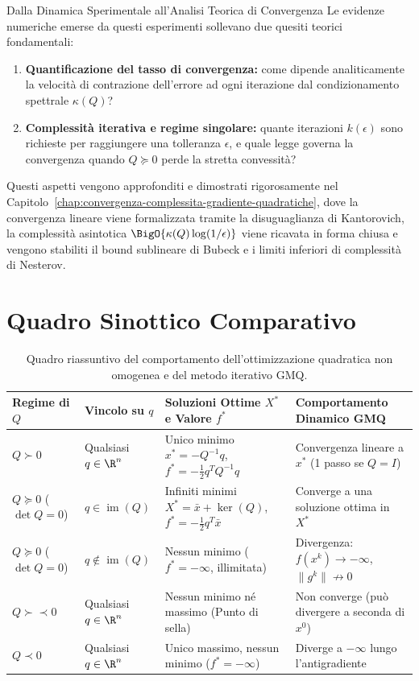 \begin{noteblock}{Dalla Dinamica Sperimentale all'Analisi Teorica di Convergenza}
Le evidenze numeriche emerse da questi esperimenti sollevano due quesiti teorici fondamentali:
\begin{enumerate}
    \item \textbf{Quantificazione del tasso di convergenza:} come dipende analiticamente la velocit\`a di contrazione dell'errore ad ogni iterazione dal condizionamento spettrale $\kappa(Q)$?
    \item \textbf{Complessit\`a iterativa e regime singolare:} quante iterazioni $k(\epsilon)$ sono richieste per raggiungere una tolleranza $\epsilon$, e quale legge governa la convergenza quando $Q \succeq 0$ perde la stretta convessit\`a?
\end{enumerate}
Questi aspetti vengono approfonditi e dimostrati rigorosamente nel Capitolo~\ref{chap:convergenza-complessita-gradiente-quadratiche}, dove la convergenza lineare viene formalizzata tramite la disuguaglianza di Kantorovich, la complessit\`a asintotica $\BigO{\kappa(Q) \log(1/\epsilon)}$ viene ricavata in forma chiusa e vengono stabiliti il bound sublineare di Bubeck e i limiti inferiori di complessit\`a di Nesterov.
\end{noteblock}

\FloatBarrier
\section{Quadro Sinottico Comparativo}
\label{sec:quadro-sinottico-ottimizzazione-quadratica}

\begin{table}[H]
\centering
\small
\renewcommand{\arraystretch}{1.35}
\begin{tabularx}{\textwidth}{l >{\raggedright\arraybackslash}p{2.6cm} Y >{\raggedright\arraybackslash}p{3.1cm}}
\toprule
\textbf{Regime di $Q$} & \textbf{Vincolo su $q$} & \textbf{Soluzioni Ottime $X^*$ e Valore $f^*$} & \textbf{Comportamento Dinamico GMQ} \\
\midrule
$Q \succ 0$ & Qualsiasi $q \in \R^n$ & Unico minimo $x^* = -Q^{-1}q$, $f^* = -\frac{1}{2}q^T Q^{-1}q$ & Convergenza lineare a $x^*$ (1 passo se $Q=I$) \\
$Q \succeq 0$ ($\det Q = 0$) & $q \in \operatorname{im}(Q)$ & Infiniti minimi $X^* = \bar{x} + \ker(Q)$, $f^* = -\frac{1}{2}q^T \bar{x}$ & Converge a una soluzione ottima in $X^*$ \\
$Q \succeq 0$ ($\det Q = 0$) & $q \notin \operatorname{im}(Q)$ & Nessun minimo ($f^* = -\infty$, illimitata) & Divergenza: $f(x^k) \to -\infty$, $\|g^k\| \not\to 0$ \\
$Q \succ\prec 0$ & Qualsiasi $q \in \R^n$ & Nessun minimo né massimo (Punto di sella) & Non converge (può divergere a seconda di $x^0$) \\
$Q \prec 0$ & Qualsiasi $q \in \R^n$ & Unico massimo, nessun minimo ($f^* = -\infty$) & Diverge a $-\infty$ lungo l'antigradiente \\
\bottomrule
\end{tabularx}
\caption{Quadro riassuntivo del comportamento dell'ottimizzazione quadratica non omogenea e del metodo iterativo GMQ.}
\label{tab:sinottico-quadratica-gmq}
\end{table}
